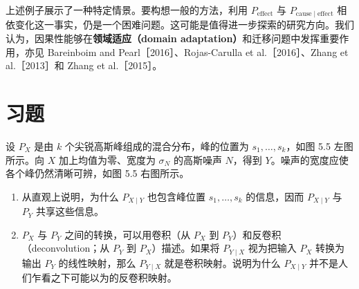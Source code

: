 上述例子展示了一种特定情景。要构想一般的方法，利用 $P_{\mathrm{effect}}$ 与 $P_{\mathrm{cause}\mid\mathrm{effect}}$ 相依变化这一事实，仍是一个困难问题。这可能是值得进一步探索的研究方向。我们认为，因果性能够在\textbf{领域适应（domain adaptation）}和迁移问题中发挥重要作用，亦见 Bareinboim and Pearl［2016］、Rojas-Carulla et al.［2016］、Zhang et al.［2013］和 Zhang et al.［2015］。


\FloatBarrier
\section{习题}
\label{sec:ch05-problems}

\setcounter{problem}{0}
\begin{problem}[机制独立性]
设 $P_X$ 是由 $k$ 个尖锐高斯峰组成的混合分布，峰的位置为 $s_1,\ldots,s_k$，如图 5.5 左图所示。向 $X$ 加上均值为零、宽度为 $\sigma_N$ 的高斯噪声 $N$，得到 $Y$。噪声的宽度应使各个峰仍然清晰可辨，如图 5.5 右图所示。
\begin{enumerate}[label=\alph*)]
 \item 从直观上说明，为什么 $P_{X\mid Y}$ 也包含峰位置 $s_1,\ldots,s_k$ 的信息，因而 $P_{X\mid Y}$ 与 $P_Y$ 共享这些信息。
 \item $P_X$ 与 $P_Y$ 之间的转换，可以用卷积（从 $P_X$ 到 $P_Y$）和反卷积（deconvolution；从 $P_Y$ 到 $P_X$）描述。如果将 $P_{Y\mid X}$ 视为把输入 $P_X$ 转换为输出 $P_Y$ 的线性映射，那么 $P_{Y\mid X}$ 就是卷积映射。说明为什么 $P_{X\mid Y}$ 并不是人们乍看之下可能以为的反卷积映射。
\end{enumerate}
\end{problem}
\FloatBarrier
